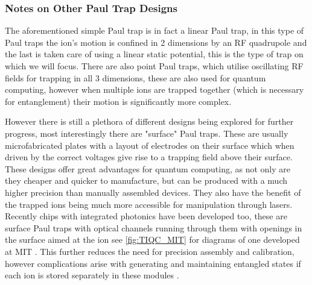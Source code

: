 \subsubsection{Notes on Other Paul Trap Designs} \label{sec:other_paultraps}
The aforementioned simple Paul trap is in fact a linear Paul trap, in this type of Paul traps the ion's motion is confined in 2 dimensions by an RF quadrupole and the last is taken care of using a linear static potential, this is the type of trap on which we will focus.
There are also point Paul traps, which utilise oscillating RF fields for trapping in all 3 dimensions, these are also used for quantum computing, however when multiple ions are trapped together (which is necessary for entanglement) their motion is significantly more complex.

However there is still a plethora of different designs being explored for further progress, most interestingly there are "surface" Paul traps.
These are usually microfabricated plates with a layout of electrodes on their surface which when driven by the correct voltages give rise to a trapping field above their surface.
These designs offer great advantages for quantum computing, as not only are they cheaper and quicker to manufacture, but can be produced with a much higher precision than manually assembled devices.
They also have the benefit of the trapped ions being much more accessible for manipulation through lasers.
Recently chips with integrated photonics have been developed too, these are surface Paul traps with optical channels running through them with openings in the surface aimed at the ion see \cref{fig:TIQC_MIT} for diagrams of one developed at MIT \cite{niffeneggerIntegratedMultiwavelengthControl2020}.
This further reduces the need for precision assembly and calibration, however complications arise with generating and maintaining entangled states if each ion is stored separately in these modules \cite{bruzewiczTrappedionQuantumComputing2019}.


